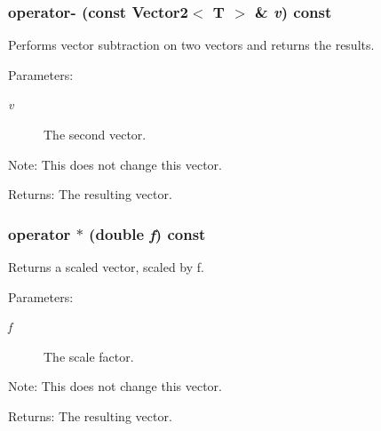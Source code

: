 \subsubsection{ operator- (const {\bf Vector2}$<$ T $>$ \& {\em v}) const\hspace{0.3cm}{\tt  [inline]}}\label{classEngine_1_1Vector2_5afcffa29af0ce2ee42edde81d556b71}


Performs vector subtraction on two vectors and returns the results. \begin{Desc}
\item[Parameters:]
\begin{description}
\item[{\em v}]The second vector. \end{description}
\end{Desc}
\begin{Desc}
\item[Note:]This does not change this vector. \end{Desc}
\begin{Desc}
\item[Returns:]The resulting vector. \end{Desc}
\subsubsection{ operator $\ast$ (double {\em f}) const\hspace{0.3cm}{\tt  [inline]}}\label{classEngine_1_1Vector2_26344b91f7755e8c369d905cdac6b010}


Returns a scaled vector, scaled by f. \begin{Desc}
\item[Parameters:]
\begin{description}
\item[{\em f}]The scale factor. \end{description}
\end{Desc}
\begin{Desc}
\item[Note:]This does not change this vector. \end{Desc}
\begin{Desc}
\item[Returns:]The resulting vector. \end{Desc}
